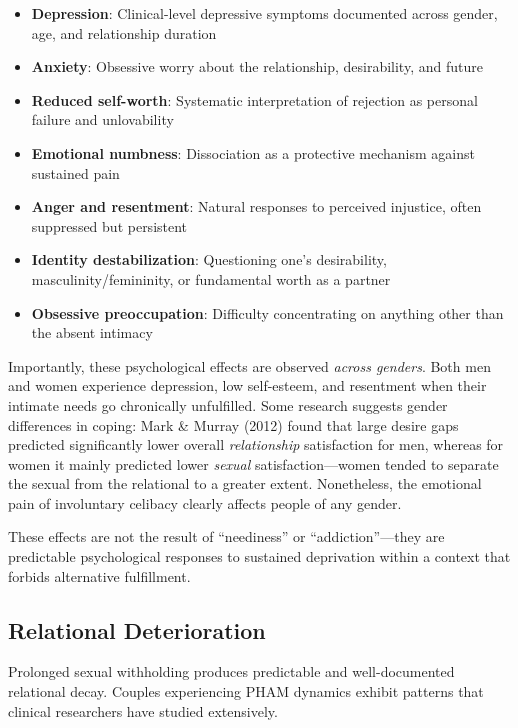 \documentclass[12pt, letterpaper]{article}
\begin{document}
\begin{itemize}
    \item \textbf{Depression}: Clinical-level depressive symptoms documented across gender, age, and relationship duration
    \item \textbf{Anxiety}: Obsessive worry about the relationship, desirability, and future
    \item \textbf{Reduced self-worth}: Systematic interpretation of rejection as personal failure and unlovability
    \item \textbf{Emotional numbness}: Dissociation as a protective mechanism against sustained pain
    \item \textbf{Anger and resentment}: Natural responses to perceived injustice, often suppressed but persistent
    \item \textbf{Identity destabilization}: Questioning one's desirability, masculinity/femininity, or fundamental worth as a partner
    \item \textbf{Obsessive preoccupation}: Difficulty concentrating on anything other than the absent intimacy
\end{itemize}

Importantly, these psychological effects are observed \textit{across genders}. Both men and women experience depression, low self-esteem, and resentment when their intimate needs go chronically unfulfilled. Some research suggests gender differences in coping: Mark \& Murray (2012) found that large desire gaps predicted significantly lower overall \textit{relationship} satisfaction for men, whereas for women it mainly predicted lower \textit{sexual} satisfaction---women tended to separate the sexual from the relational to a greater extent. Nonetheless, the emotional pain of involuntary celibacy clearly affects people of any gender.

These effects are not the result of ``neediness'' or ``addiction''---they are predictable psychological responses to sustained deprivation within a context that forbids alternative fulfillment.

\subsection{Relational Deterioration}

Prolonged sexual withholding produces predictable and well-documented relational decay. Couples experiencing PHAM dynamics exhibit patterns that clinical researchers have studied extensively.
\end{document}
